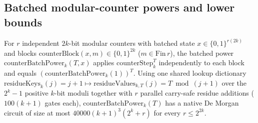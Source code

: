 \begin{result}
\subsection{Batched modular-counter powers and lower bounds}
For $r$ independent $2k$-bit modular counters with batched state $x\in\{0,1\}^{r(2k)}$ and blocks
$\mathrm{counterBlock}(x,m)\in\{0,1\}^{2k}$ ($m\in\mathrm{Fin}\,r$), the batched power
$\mathrm{counterBatchPower}_k(T,x)$ applies $\mathrm{counterStep}_k^T$ independently to each block
and equals $(\mathrm{counterBatchPower}_k(1))^T$. Using one shared lookup dictionary
$\mathrm{residueKeys}_k(j)=j+1\mapsto\mathrm{residueValues}_{k,T}(j)=T\bmod(j+1)$ over the
$2^k-1$ positive $k$-bit moduli together with $r$ parallel carry-safe residue additions
($100(k+1)$ gates each), $\mathrm{counterBatchPower}_k(T)$ has a native De Morgan circuit of size
at most $40000(k+1)^3(2^k+r)$ for every $r\le 2^{2k}$.


\end{result}
